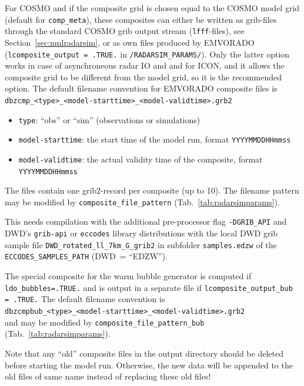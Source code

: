 \documentclass[10pt,a4paper,twoside,headinclude,footinclude,parskip=half]{scrartcl}
\newcommand{\srcform}[1]{\mbox{\texttt{#1}}\xspace}%
\newcommand{\paramform}[1]{\mbox{\texttt{#1}}\xspace}%
\begin{document}
  For COSMO and if the composite grid is chosen equal to the COSMO model grid (default for \paramform{comp_meta}), these composites can either be written as grib-files
  through the standard COSMO grib output stream (\srcform{lfff}-files), see Section~\ref{sec:nmlradarsim}, or as own files produced
  by EMVORADO (\srcform{lcomposite_output = .TRUE.} in \srcform{/RADARSIM_PARAMS/}).
  Only the latter option works in case of asynchroneous radar IO and and for ICON, and it allows the composite grid to be
  different from the model grid, so it is the recommended option. The default filename convention for EMVORADO composite files is\\[0.5em]
  \verb|dbzcmp_<type>_<model-starttime>_<model-validtime>.grb2|
  \begin{itemize}
  \item \verb|type|: ``obs'' or ``sim'' (observations or simulations)
  \item \verb|model-starttime|: the start time of the model run, format \verb|YYYYMMDDHHmmss|
  \item \verb|model-validtime|: the actual validity time of the composite, format \verb|YYYYMMDDHHmmss|
  \end{itemize}
  The files contain one grib2-record per composite (up to 10). The filename pattern may be modified by \paramform{composite_file_pattern} (Tab.~\ref{tab:radarsimparams}).

  This needs compilation with the additional pre-processor flag \srcform{-DGRIB_API} and DWD's \srcform{grib-api} or \srcform{eccodes} library distributions with the
  local DWD grib sample file \srcform{DWD_rotated_ll_7km_G_grib2} in subfolder \srcform{samples.edzw} of the \srcform{ECCODES_SAMPLES_PATH} (DWD~= ``EDZW'').

  The special composite for the warm bubble generator is computed if \srcform{ldo_bubbles=.TRUE.} and is output in a separate file if \srcform{lcomposite_output_bub = .TRUE.}
  The default filename convention is\\[0.5em]
  \verb|dbzcmpbub_<type>_<model-starttime>_<model-validtime>.grb2|\\[0.5em]
  and may be modified by \paramform{composite_file_pattern_bub} (Tab.~\ref{tab:radarsimparams}).
  
  Note that any ``old'' composite files in the output directory should
  be deleted before starting the model run. Otherwise, the new data will be appended to the old files
  of same name instead of replacing these old files!
\end{document}
